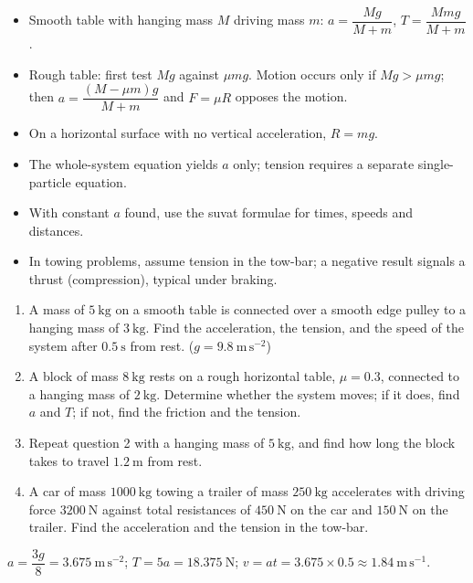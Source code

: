 \documentclass[11pt]{article}
\begin{document}
\begin{aretenir}
\begin{itemize}
\item Smooth table with hanging mass $M$ driving mass $m$: $a = \dfrac{Mg}{M+m}$, $T = \dfrac{Mmg}{M+m}$.
\item Rough table: first test $Mg$ against $\mu mg$. Motion occurs only if $Mg > \mu mg$; then $a = \dfrac{(M-\mu m)g}{M+m}$ and $F = \mu R$ opposes the motion.
\item On a horizontal surface with no vertical acceleration, $R = mg$.
\item The whole-system equation yields $a$ only; tension requires a separate single-particle equation.
\item With constant $a$ found, use the suvat formulae for times, speeds and distances.
\item In towing problems, assume tension in the tow-bar; a negative result signals a thrust (compression), typical under braking.
\end{itemize}
\end{aretenir}

\begin{exercice}[Practice]
\begin{enumerate}
\item A mass of $5\ \mathrm{kg}$ on a smooth table is connected over a smooth edge pulley to a hanging mass of $3\ \mathrm{kg}$. Find the acceleration, the tension, and the speed of the system after $0.5\ \mathrm{s}$ from rest. ($g = 9.8\ \mathrm{m\,s^{-2}}$)
\item A block of mass $8\ \mathrm{kg}$ rests on a rough horizontal table, $\mu = 0.3$, connected to a hanging mass of $2\ \mathrm{kg}$. Determine whether the system moves; if it does, find $a$ and $T$; if not, find the friction and the tension.
\item Repeat question 2 with a hanging mass of $5\ \mathrm{kg}$, and find how long the block takes to travel $1.2\ \mathrm{m}$ from rest.
\item A car of mass $1000\ \mathrm{kg}$ towing a trailer of mass $250\ \mathrm{kg}$ accelerates with driving force $3200\ \mathrm{N}$ against total resistances of $450\ \mathrm{N}$ on the car and $150\ \mathrm{N}$ on the trailer. Find the acceleration and the tension in the tow-bar.
\end{enumerate}
\end{exercice}

\begin{corrige}[Exercise 1]
$a = \dfrac{3g}{8} = 3.675\ \mathrm{m\,s^{-2}}$; $T = 5a = 18.375\ \mathrm{N}$; $v = at = 3.675 \times 0.5 \approx 1.84\ \mathrm{m\,s^{-1}}$.
\end{corrige}
\end{document}
